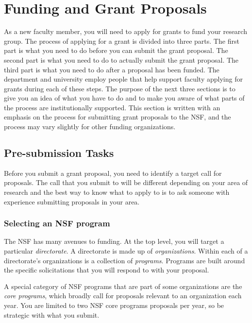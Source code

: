 \section{Funding and Grant Proposals}

As a new faculty member, you will need to apply for grants to fund your
research group.  The process of applying for a grant is divided into three
parts.  The first part is what you need to do before you can submit the grant
proposal.  The second part is what you need to do to actually submit the grant
proposal.  The third part is what you need to do after a proposal has been
funded.  The department and university employ people that help support faculty
applying for grants during each of these steps.  The purpose of the next three
sections is to give you an idea of what you have to do and to make you aware of
what parts of the process are institutionally supported.  This section is
written with an emphasis on the process for submitting grant proposals to the
NSF, and the process may vary slightly for other funding organizations.

\subsection{Pre-submission Tasks}
Before you submit a grant proposal, you need to identify a target call for
proposals.  The call that you submit to will be different depending on your
area of research and the best way to know what to apply to is to ask someone
with experience submitting proposals in your area.  

\subsubsection{Selecting an NSF program}
The NSF has many avenues to funding.  At the top level, you will target a
particular {\em directorate}.  A directorate is made up of {\em organizations}.
Within each of a directorate's organizations is a collection of {\em programs}.
Programs are built around the specific solicitations that you will respond to
with your proposal.  

A special category of NSF programs that are part of some organizations are the
{\em core programs}, which broadly call for proposals relevant to an
organization each year.  You are limited to two NSF core programs proposals per
year, so be strategic with what you submit.  

